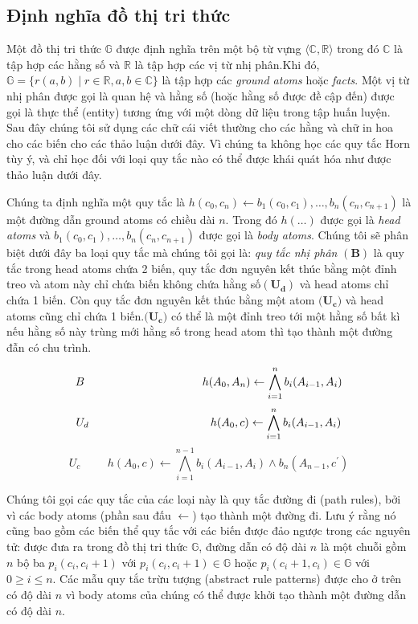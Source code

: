 \subsection{Định nghĩa đồ thị  tri thức} \label{kg}
Một đồ thị tri thức \(\mathbb{G}\) được định nghĩa trên một bộ từ vựng \(\langle \mathbb{C}, \mathbb{R} \rangle\) trong đó \(\mathbb{C}\) là tập hợp các hằng số và \(\mathbb{R}\) là tập hợp các vị từ nhị phân.Khi đó, \(\mathbb{G} = \{r (a, b) \mid r \in \mathbb{R}, a, b \in \mathbb{C}\}\) là tập hợp các \textit{ground atoms} hoặc \textit{facts}. Một vị từ nhị phân được gọi là quan hệ và hằng số (hoặc hằng số được đề cập đến) được gọi là thực thể (entity) tương ứng với một dòng dữ liệu trong tập huấn luyện. Sau đây chúng tôi sử dụng các chữ cái viết thường cho các hằng và chữ in hoa cho các biến cho các thảo luận dưới đây. Vì chúng ta không học các quy tắc Horn tùy ý, và chỉ học đối với loại quy tắc nào có thể được khái quát hóa như được thảo luận dưới đây.

Chúng ta định nghĩa một quy tắc là \(h(c_0, c_n) \gets b_1(c_0, c_1) ,\dots ,b_n(c_{n}, c_{n + 1})\) là một đường dẫn ground atoms có chiều dài \(n\). Trong đó \(h(\dots)\) được gọi là \textit{head atoms} và \( b_1(c_0, c_1) ,\dots ,b_n(c_{n}, c_{n + 1})\) được gọi là \textit{body atoms}. Chúng tôi sẽ phân biệt dưới đây ba loại quy tắc mà chúng tôi gọi là: \textit{quy tắc nhị phân} \((\mathbf{B})\) là quy tắc trong head atoms chứa 2 biến, quy tắc đơn nguyên kết thúc bằng một đỉnh treo  và atom này chỉ chứa biến không chứa hằng số\((\mathbf{U_d})\) và head atoms chỉ chứa 1 biến. Còn quy tắc đơn nguyên kết thúc bằng một atom \((\mathbf{U_c)}\) và head atoms cũng chỉ chứa 1 biến.\((\mathbf{U_c)}\)  có thể là một đỉnh treo tới một hằng số bất kì nếu hằng số này trùng mới hằng số trong head atom thì tạo thành một đường đẫn có chu trình.

\[B \hspace{3.7cm} h(A_0,A_n) \gets  \bigwedge^n_{i=1} b_i(A_{i-1}, A_i)\]
\[U_d \hspace{3.8cm} h(A_0,c) \gets  \bigwedge^n_{i=1} b_i(A_{i-1}, A_i)\]
\[U_c \hspace{1cm} h(A_0,c) \gets  \bigwedge^{n-1}_{i=1} b_i(A_{i-1}, A_i) \wedge b_n(A_{n-1}, c^{\prime})\]

Chúng tôi gọi các quy tắc của các loại này là quy tắc đường đi (path rules), bởi vì các body atoms (phần sau đấu \(\gets\)) tạo thành một đường đi. Lưu ý rằng nó cũng bao gồm các biến thể quy tắc với các biến được đảo ngược trong các nguyên tử: được đưa ra trong đồ thị tri thức \(\mathbb{G}\), đường dẫn có độ dài \(n\) là một chuỗi gồm \(n\) bộ ba \(p_i (c_i, c_i + 1)\) với \(p_i (c_i, c_i + 1) \in \mathbb{G}\) hoặc \(p_i (c_i + 1, c_i) \in \mathbb{G}\) với \(0 \geq i \leq n\). Các mẫu quy tắc trừu tượng (abstract rule patterns) được cho ở trên có độ dài \(n\) vì body atoms của chúng có thể được khởi tạo thành một đường dẫn có độ dài \(n\).

